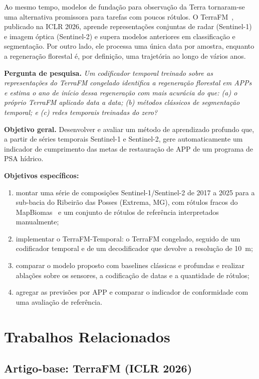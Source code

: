 \documentclass[conference]{IEEEtran}
\begin{document}
Ao mesmo tempo, modelos de fundação para observação da Terra tornaram-se uma alternativa promissora para tarefas com poucos rótulos. O TerraFM~\citep{danish2026terrafm}, publicado na ICLR 2026, aprende representações conjuntas de radar (Sentinel-1) e imagem óptica (Sentinel-2) e supera modelos anteriores em classificação e segmentação. Por outro lado, ele processa uma única data por amostra, enquanto a regeneração florestal é, por definição, uma trajetória ao longo de vários anos.

\textbf{Pergunta de pesquisa.} \textit{Um codificador temporal treinado sobre as representações do TerraFM congelado identifica a regeneração florestal em APPs e estima o ano de início dessa regeneração com mais acurácia do que: (a) o próprio TerraFM aplicado data a data; (b) métodos clássicos de segmentação temporal; e (c) redes temporais treinadas do zero?}

\textbf{Objetivo geral.} Desenvolver e avaliar um método de aprendizado profundo que, a partir de séries temporais Sentinel-1 e Sentinel-2, gere automaticamente um indicador de cumprimento das metas de restauração de APP de um programa de PSA hídrico.

\textbf{Objetivos específicos:}
\begin{enumerate}
\item montar uma série de composições Sentinel-1/Sentinel-2 de 2017 a 2025 para a sub-bacia do Ribeirão das Posses (Extrema, MG), com rótulos fracos do MapBiomas~\citep{souza2020} e um conjunto de rótulos de referência interpretados manualmente;
\item implementar o TerraFM-Temporal: o TerraFM congelado, seguido de um codificador temporal e de um decodificador que devolve a resolução de 10~m;
\item comparar o modelo proposto com baselines clássicas e profundas e realizar ablações sobre os sensores, a codificação de datas e a quantidade de rótulos;
\item agregar as previsões por APP e comparar o indicador de conformidade com uma avaliação de referência.
\end{enumerate}

\section{Trabalhos Relacionados}\label{sec:relacionados}

\subsection{Artigo-base: TerraFM (ICLR 2026)}
\end{document}

